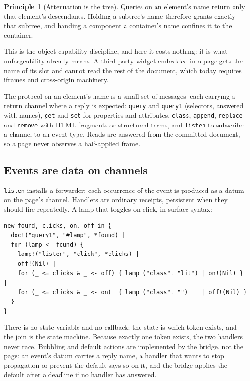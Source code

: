 \documentclass[11pt]{article}
\theoremstyle{definition}
\newtheorem{principle}{Principle}
\theoremstyle{remark}
\newcommand{\code}[1]{\texttt{#1}}
\begin{document}
\begin{principle}[Attenuation is the tree]
Queries on an element's name return only that element's descendants. Holding a
subtree's name therefore grants exactly that subtree, and handing a component a
container's name confines it to the container.
\end{principle}

\noindent
This is the object-capability discipline, and here it costs nothing: it is what
unforgeability already means. A third-party widget embedded in a page gets the name of
its slot and cannot read the rest of the document, which today requires iframes and
cross-origin machinery.

The protocol on an element's name is a small set of messages, each carrying a return
channel where a reply is expected: \code{query} and \code{query1} (selectors, answered
with names), \code{get} and \code{set} for properties and attributes, \code{class},
\code{append}, \code{replace} and \code{remove} with HTML fragments or structured terms,
and \code{listen} to subscribe a channel to an event type. Reads are answered from the
committed document, so a page never observes a half-applied frame.

\subsection{Events are data on channels}

\code{listen} installs a forwarder: each occurrence of the event is produced as a
datum on the page's channel. Handlers are ordinary receipts, persistent when they
should fire repeatedly. A lamp that toggles on click, in surface syntax:

\begin{lstlisting}
new found, clicks, on, off in {
  doc!("query1", "#lamp", *found) |
  for (lamp <- found) {
    lamp!("listen", "click", *clicks) |
    off!(Nil) |
    for (_ <= clicks & _ <- off) { lamp!("class", "lit") | on!(Nil) } |
    for (_ <= clicks & _ <- on)  { lamp!("class", "")    | off!(Nil) }
  }
}
\end{lstlisting}

\noindent
There is no state variable and no callback: the state is which token exists, and the
join is the state machine. Because exactly one token exists, the two handlers never
race. Bubbling and default actions are implemented by the bridge, not the page:
an event's datum carries a reply name, a handler that wants to stop propagation or
prevent the default says so on it, and the bridge applies the default after a
deadline if no handler has answered.
\end{document}
